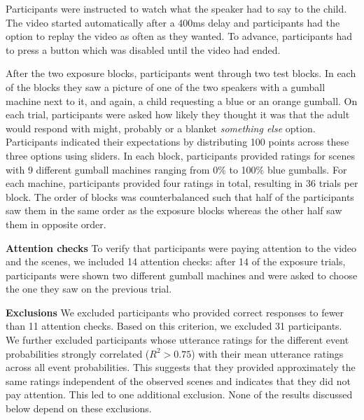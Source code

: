 Participants were instructed to watch what the speaker had to say to the child. The video started automatically after a 400ms delay and participants had the option to replay the video as often as they wanted. To advance, participants had to press a button which was disabled until the video had ended.

 After the two exposure blocks, participants went through two test blocks. In each of the blocks they saw a picture of one of the two speakers with a gumball machine next to it, and again, a child requesting a blue or an orange gumball. On each trial, participants were asked how likely they thought it was that the adult would respond with {\sc might}, {\sc probably} or a blanket \textit{something else} option. Participants indicated their expectations by distributing 100 points across these three options using sliders. In each block, participants provided ratings for scenes with 9 different gumball machines ranging from 0\% to 100\% blue gumballs. For each machine, participants provided four ratings in total, resulting in 36 trials per block. The order of blocks was counterbalanced such that half of the participants saw them in the same order as the exposure blocks whereas the other half saw them in opposite order.

\noindent \textbf{Attention checks}  To verify that participants were paying attention to the video and the scenes, we included 14 attention checks: after 14 of the exposure trials, participants were shown two different gumball machines and were asked to choose the one they saw on the previous trial. 

\noindent \textbf{Exclusions} We excluded participants who provided correct responses to fewer than 11 attention checks. Based on this criterion, we excluded 31 participants. We further excluded participants whose utterance ratings for the different event probabilities strongly correlated ($R^2 > 0.75$) with their mean utterance ratings across all event probabilities. This suggests that they provided approximately the same ratings independent of the observed scenes and indicates that they did not pay attention. This led to one additional exclusion. None of the results discussed below depend on these exclusions.


